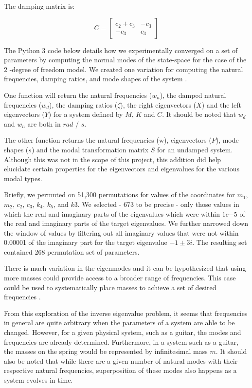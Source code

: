 \documentclass[10pt,a4paper]{article}
\begin{document}
\begin{multicols*}{2}
The damping matrix is:

\begin{equation}
C = 
\begin{bmatrix} 
        c_2 + c_3 & -c_3\\
        -c_3 & c_3
\end{bmatrix}
\end{equation}


The Python 3 code below details how we experimentally converged on a set of parameters by computing the normal modes of the state-space \cite{quadratic} for the case of the 2 -degree of freedom model. We created one variation for computing the natural frequencies, damping ratios, and mode shapes of the system \cite{normal_modes}. 

One function will return the natural frequencies ($w_n$), the damped natural frequencies ($w_d$), the damping ratios ($\zeta$), the right eigenvectors ($X$) and the left eigenvectors ($Y$) for a system defined by $M$, $K$ and $C$. It should be noted that $w_d$ and $w_n$ are both in $rad$ / $s$.

The other function returns the natural frequencies (w), eigenvectors ($P$), mode shapes ($s$) and the modal transformation matrix $S$ \cite{adams} for an undamped system. Although this was not in the scope of this project, this addition did help elucidate certain properties for the eigenvectors and eigenvalues for the various modal types.

Briefly, we permuted on 51,300 permutations for values of the coordinates for $m_1$, $m_2$, $c_2$, $c_3$, $k_4$, $k_5$, and $k3$. We selected - 673 to be precise -  only those values in which the real and imaginary parts of the eigenvalues which were within $1\mathrm{e}{-5}$ of the real and imaginary parts of the target eigenvalues. We further narrowed down the window of values by filtering out all imaginary values that were not within 0.00001 of the imaginary part for the target eigenvalue $-1 {\pm}  3i$. The resulting set contained 268 permutation set of parameters.

There is much variation in the eigenmodes and it can be hypothesized that using more masses could provide access to a broader range of frequencies. This case could be used to systematically place masses to achieve a set of desired frequencies \cite{perterbation}.

From this exploration of the inverse eigenvalue problem, it seems that frequencies in general are quite arbitrary when the parameters of a system are able to be changed. However, for a given physical system, such as a guitar, the modes and frequencies are already determined. Furthermore, in a system such as a guitar, the masses on the spring would be represented by infinitesimal mass $m$. It should also be noted that while there are a given number of natural modes with their respective natural frequencies, superposition of these modes also happens as a system evolves in time.

\end{multicols*}
\end{document}
